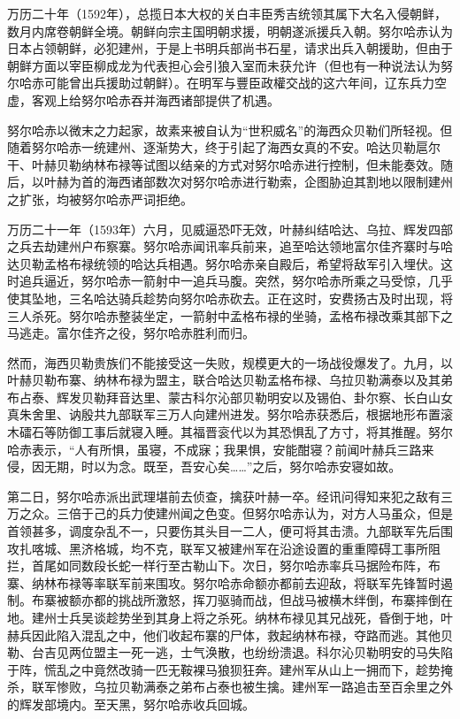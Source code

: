 万历二十年（1592年），总揽日本大权的关白丰臣秀吉统领其属下大名入侵朝鲜，数月内席卷朝鲜全境。朝鲜向宗主国明朝求援，明朝遂派援兵入朝。努尔哈赤认为日本占领朝鲜，必犯建州，于是上书明兵部尚书石星，请求出兵入朝援助，但由于朝鲜方面以宰臣柳成龙为代表担心会引狼入室而未获允许（但也有一种说法认为努尔哈赤可能曾出兵援助过朝鲜）。在明军与豐臣政權交战的这六年间，辽东兵力空虚，客观上给努尔哈赤吞并海西诸部提供了机遇。

努尔哈赤以微末之力起家，故素来被自认为“世积威名”的海西众贝勒们所轻视。但随着努尔哈赤一统建州、逐渐势大，终于引起了海西女真的不安。哈达贝勒扈尔干、叶赫贝勒纳林布禄等试图以结亲的方式对努尔哈赤进行控制，但未能奏效。随后，以叶赫为首的海西诸部数次对努尔哈赤进行勒索，企图胁迫其割地以限制建州之扩张，均被努尔哈赤严词拒绝。

万历二十一年（1593年）六月，见威逼恐吓无效，叶赫纠结哈达、乌拉、辉发四部之兵去劫建州户布察寨。努尔哈赤闻讯率兵前来，追至哈达领地富尔佳齐寨时与哈达贝勒孟格布禄统领的哈达兵相遇。努尔哈赤亲自殿后，希望将敌军引入埋伏。这时追兵逼近，努尔哈赤一箭射中一追兵马腹。突然，努尔哈赤所乘之马受惊，几乎使其坠地，三名哈达骑兵趁势向努尔哈赤砍去。正在这时，安费扬古及时出现，将三人杀死。努尔哈赤整装坐定，一箭射中孟格布禄的坐骑，孟格布禄改乘其部下之马逃走。富尔佳齐之役，努尔哈赤胜利而归。

然而，海西贝勒贵族们不能接受这一失败，规模更大的一场战役爆发了。九月，以叶赫贝勒布寨、纳林布禄为盟主，联合哈达贝勒孟格布禄、乌拉贝勒满泰以及其弟布占泰、辉发贝勒拜音达里、蒙古科尔沁部贝勒明安以及锡伯、卦尔察、长白山女真朱舍里、讷殷共九部联军三万人向建州进发。努尔哈赤获悉后，根据地形布置滚木礌石等防御工事后就寝入睡。其福晋衮代以为其恐惧乱了方寸，将其推醒。努尔哈赤表示，“人有所惧，虽寝，不成寐；我果惧，安能酣寝？前闻叶赫兵三路来侵，因无期，时以为念。既至，吾安心矣……”之后，努尔哈赤安寝如故。

第二日，努尔哈赤派出武理堪前去侦查，擒获叶赫一卒。经讯问得知来犯之敌有三万之众。三倍于己的兵力使建州闻之色变。但努尔哈赤认为，对方人马虽众，但是首领甚多，调度杂乱不一，只要伤其头目一二人，便可将其击溃。九部联军先后围攻扎喀城、黑济格城，均不克，联军又被建州军在沿途设置的重重障碍工事所阻拦，首尾如同数段长蛇一样行至古勒山下。次日，努尔哈赤率兵马据险布阵，布寨、纳林布禄等率联军前来围攻。努尔哈赤命额亦都前去迎敌，将联军先锋暂时遏制。布寨被额亦都的挑战所激怒，挥刀驱骑而战，但战马被横木绊倒，布寨摔倒在地。建州士兵吴谈趁势坐到其身上将之杀死。纳林布禄见其兄战死，昏倒于地，叶赫兵因此陷入混乱之中，他们收起布寨的尸体，救起纳林布禄，夺路而逃。其他贝勒、台吉见两位盟主一死一逃，士气涣散，也纷纷溃退。科尔沁贝勒明安的马失陷于阵，慌乱之中竟然改骑一匹无鞍裸马狼狈狂奔。建州军从山上一拥而下，趁势掩杀，联军惨败，乌拉贝勒满泰之弟布占泰也被生擒。建州军一路追击至百余里之外的辉发部境内。至天黑，努尔哈赤收兵回城。

